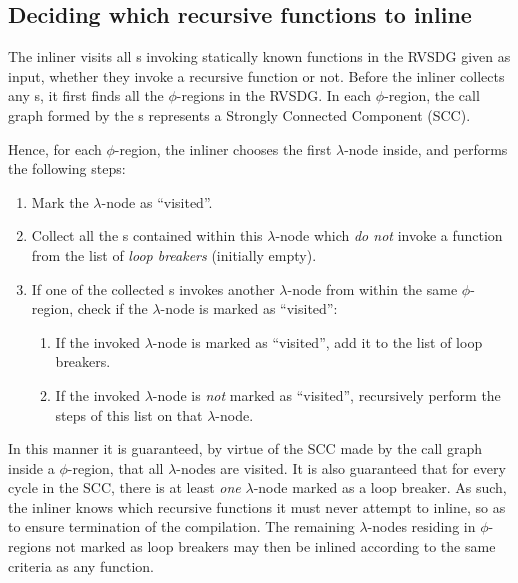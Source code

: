 \subsection{Deciding which recursive functions to inline}
\label{sub:scheme:inlining_recur_apply_nodes}

The inliner visits all \applyNode s invoking statically known functions in the
RVSDG given as input, whether they invoke a recursive function or not. Before
the inliner collects any \applyNode s, it first finds all the $\phi$-regions in
the RVSDG. In each $\phi$-region, the call graph formed by the \applyNode s
represents a Strongly Connected Component (SCC).

Hence, for each $\phi$-region, the inliner chooses the first $\lambda$-node
inside, and performs the following steps:

\begin{enumerate}
	\item Mark the $\lambda$-node as ``visited''.

	\item Collect all the \applyNode s contained within this $\lambda$-node
which \textit{do not} invoke a function from the list of \textit{loop breakers}
(initially empty).

	\item If one of the collected \applyNode s invokes another $\lambda$-node
from within the same $\phi$-region, check if the $\lambda$-node is marked as
``visited'':
	\begin{enumerate}
		\item If the invoked $\lambda$-node is marked as ``visited'', add it to
the list of loop breakers.

		\item If the invoked $\lambda$-node is \textit{not} marked as
``visited'', recursively perform the steps of this list on that $\lambda$-node.
	\end{enumerate}
\end{enumerate}

In this manner it is guaranteed, by virtue of the SCC made by the call graph
inside a $\phi$-region, that all $\lambda$-nodes are visited. It is also
guaranteed that for every cycle in the SCC, there is at least \textit{one}
$\lambda$-node marked as a loop breaker. As such, the inliner knows which
recursive functions it must never attempt to inline, so as to ensure termination
of the compilation. The remaining $\lambda$-nodes residing in $\phi$-regions not
marked as loop breakers may then be inlined according to the same criteria as
any  function.

